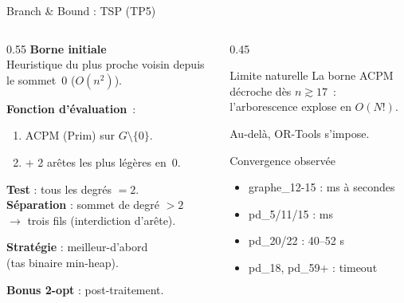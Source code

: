 \documentclass[aspectratio=169, 11pt]{beamer}
\begin{document}
\begin{frame}{Branch \& Bound : TSP (TP5)}
\begin{columns}[T]
\begin{column}{0.55\textwidth}
\textbf{Borne initiale} \\
Heuristique du \alert{plus proche voisin} depuis le sommet~0 ($O(n^2)$).

\vspace{0.4em}
\textbf{Fonction d'évaluation}~:
\begin{enumerate}\setlength\itemsep{-0.15em}
  \item ACPM (Prim) sur $G \setminus \{0\}$.
  \item + 2 arêtes les plus légères en~0.
\end{enumerate}

\vspace{0.4em}
\textbf{Test} : tous les degrés $= 2$. \\
\textbf{Séparation} : sommet de degré $> 2$ \\ $\to$ trois fils (interdiction d'arête).

\vspace{0.4em}
\textbf{Stratégie} : \alert{meilleur-d'abord} \\ (tas binaire min-heap).

\vspace{0.4em}
\textbf{Bonus 2-opt} : post-traitement.
\end{column}
\begin{column}{0.45\textwidth}
\begin{alertblock}{Limite naturelle}
La borne ACPM décroche dès $n \gtrsim 17$~: \\ l'arborescence explose en $O(N!)$.

Au-delà, OR-Tools s'impose.
\end{alertblock}

\begin{exampleblock}{Convergence observée}
\begin{itemize}\setlength\itemsep{-0.2em}
  \item graphe\_12-15 : ms à secondes
  \item pd\_5/11/15 : ms
  \item pd\_20/22 : 40--52 s
  \item pd\_18, pd\_59+ : timeout
\end{itemize}
\end{exampleblock}
\end{column}
\end{columns}
\end{frame}
\end{document}
